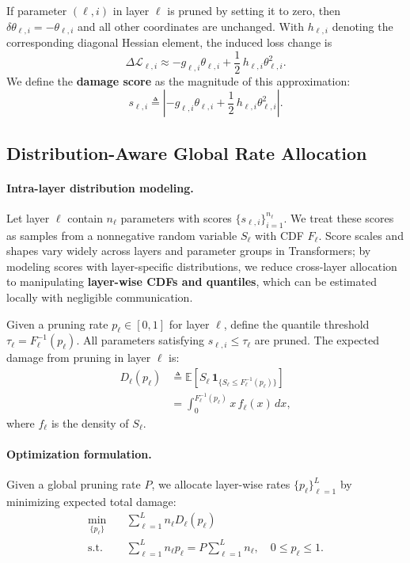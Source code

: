 ﻿\documentclass[11pt]{article}
\begin{document}
If parameter $(\ell,i)$ in layer $\ell$ is pruned by setting it to zero, then $\delta\theta_{\ell,i}=-\theta_{\ell,i}$ and all other coordinates are unchanged. With $h_{\ell,i}$ denoting the corresponding diagonal Hessian element, the induced loss change is
\begin{equation}
\Delta\mathcal{L}_{\ell,i}
\approx
-g_{\ell,i}\theta_{\ell,i}
+
\frac{1}{2}\,h_{\ell,i}\theta_{\ell,i}^2.
\end{equation}
We define the \textbf{damage score} as the magnitude of this approximation:
\begin{equation}
s_{\ell,i}
\triangleq
\left|
-g_{\ell,i}\theta_{\ell,i}
+
\frac{1}{2}\,h_{\ell,i}\theta_{\ell,i}^2
\right|.
\end{equation}

\subsection{Distribution-Aware Global Rate Allocation}
\label{sec:rate-allocation}

\paragraph{Intra-layer distribution modeling.}
Let layer $\ell$ contain $n_\ell$ parameters with scores $\{s_{\ell,i}\}_{i=1}^{n_\ell}$. We treat these scores as samples from a nonnegative random variable $S_\ell$ with CDF $F_\ell$. Score scales and shapes vary widely across layers and parameter groups in Transformers; by modeling scores with layer-specific distributions, we reduce cross-layer allocation to manipulating \textbf{layer-wise CDFs and quantiles}, which can be estimated locally with negligible communication.

Given a pruning rate $p_\ell\in[0,1]$ for layer $\ell$, define the quantile threshold $\tau_\ell = F_\ell^{-1}(p_\ell)$. All parameters satisfying $s_{\ell,i}\le \tau_\ell$ are pruned. The expected damage from pruning in layer $\ell$ is:
\begin{equation}
\begin{aligned}
D_\ell(p_\ell)
&\triangleq
\mathbb{E}\!\left[S_\ell\,\mathbf{1}_{\{S_\ell\le F_\ell^{-1}(p_\ell)\}}\right] \\
&=\int_{0}^{F_\ell^{-1}(p_\ell)} x\,f_\ell(x)\,dx,
\end{aligned}
\end{equation}
where $f_\ell$ is the density of $S_\ell$.

\paragraph{Optimization formulation.}
Given a global pruning rate $P$, we allocate layer-wise rates $\{p_\ell\}_{\ell=1}^L$ by minimizing expected total damage:
\begin{equation}
\begin{aligned}
\min_{\{p_\ell\}}\quad &\sum_{\ell=1}^L n_\ell D_\ell(p_\ell) \\
\text{s.t.}\quad &\sum_{\ell=1}^L n_\ell p_\ell
= P\sum_{\ell=1}^L n_\ell, \quad
0\le p_\ell\le 1.
\end{aligned}
\end{equation}
\end{document}
